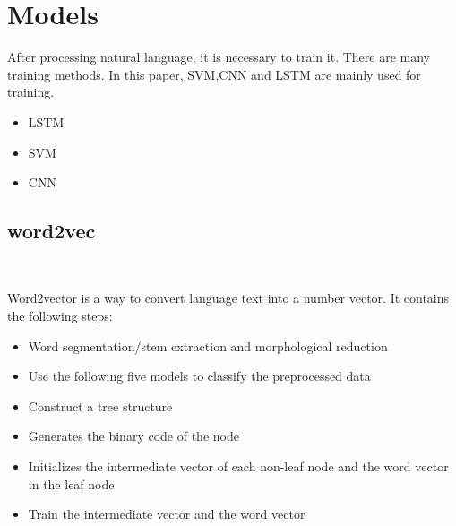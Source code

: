 

\section{Models}

After processing natural language, 
it is necessary to train it. 
There are many training methods.
 In this paper, SVM,CNN and LSTM are mainly used for training.
\begin{itemize}
	\item  LSTM
	\item  SVM
	\item  CNN
  \end{itemize}
\subsection{word2vec}
\ 

Word2vector is a way to convert language text into a number vector.
It contains the following steps:
\begin{itemize}
	\item  Word segmentation/stem extraction and morphological reduction
	\item  Use the following five models to classify the preprocessed data
	\item  Construct a tree structure
	\item Generates the binary code of the node
	\item Initializes the intermediate vector of each non-leaf node and the word vector in the leaf node
	\item Train the intermediate vector and the word vector
  \end{itemize}



